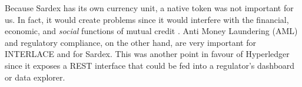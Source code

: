 Because Sardex has its own currency unit, a native token was not important for us. In fact, it would create problems since it would interfere with the financial, economic, and \emph{social} functions of mutual credit \cite{SartoriDini2016}. Anti Money Laundering (AML) and regulatory compliance, on the other hand, are very important for INTERLACE and for Sardex. This was another point in favour of Hyperledger since it exposes a REST interface that could be fed into a regulator's dashboard or data explorer.



